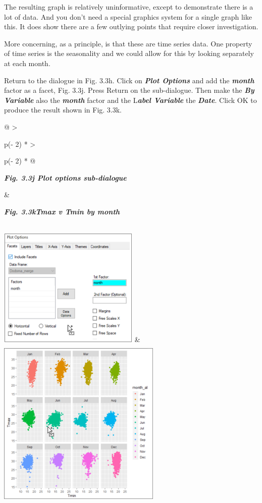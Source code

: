 \documentclass[
  letterpaper,
  DIV=11,
  numbers=noendperiod]{scrreprt}
\begin{document}
The resulting graph is relatively uninformative, except to demonstrate
there is a lot of data. And you don't need a special graphics system for
a single graph like this. It does show there are a few outlying points
that require closer investigation.

More concerning, as a principle, is that these are time series data. One
property of time series is the seasonality and we could allow for this
by looking separately at each month.

Return to the dialogue in Fig. 3.3h. Click on \textbf{\emph{Plot
Options}} and add the \textbf{\emph{month}} factor as a facet, Fig.
3.3j. Press Return on the sub-dialogue. Then make the \textbf{\emph{By
Variable}} also the \textbf{\emph{month}} factor and the
L\textbf{\emph{abel Variable}} the \textbf{\emph{Date}}. Click OK to
produce the result shown in Fig. 3.3k.

\begin{longtable}[]{@{}
  >{\raggedright\arraybackslash}p{(\columnwidth - 2\tabcolsep) * }
  >{\raggedright\arraybackslash}p{(\columnwidth - 2\tabcolsep) * }@{}}
\toprule\noalign{}
\begin{minipage}[b]{\linewidth}\raggedright
\textbf{\emph{Fig. 3.3j Plot options sub-dialogue}}
\end{minipage} & \begin{minipage}[b]{\linewidth}\raggedright
\textbf{\emph{Fig. 3.3kTmax v Tmin by month}}
\end{minipage} \\
\midrule\noalign{}
\endhead
\bottomrule\noalign{}
\endlastfoot
\includegraphics[width=2.64658in,height=2.24218in]{figures/Fig3.3j.png}
&
\includegraphics[width=3.07205in,height=3.2636in]{figures/Fig3.3k.png} \\
\end{longtable}
\end{document}
